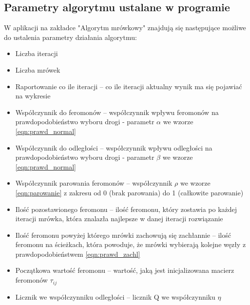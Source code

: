 \documentclass[12pt]{article}
\begin{document}
\subsection{Parametry algorytmu ustalane w programie}
W aplikacji na zakładce "Algorytm mrówkowy" znajdują się następujące możliwe do ustalenia parametry działania algorytmu:
\begin{itemize}
\item Liczba iteracji
\item Liczba mrówek
\item Raportowanie co ile iteracji -- co ile iteracji aktualny wynik ma się pojawiać na wykresie
\item Współczynnik do feromonów -- współczynnik wpływu feromonów na prawdopodobieństwo wyboru drogi - parametr $\alpha$ we wzorze \eqref{eqn:prawd_normal}
\item Współczynnik do odległości -- współczynnik wpływu odległości na prawdopodobieństwo wyboru drogi - parametr $\beta$ we wzorze \eqref{eqn:prawd_normal}
\item Współczynnik parowania feromonów -- współczynnik $\rho$ we wzorze \eqref{eqn:parowanie} z zakresu od 0 (brak parowania) do 1 (całkowite parowanie)
\item Ilość pozostawionego feromonu -- ilość feromonu, który zostawia po każdej iteracji mrówka, która znalazła najlepsze w danej iteracji rozwiązanie
\item Ilość feromonu powyżej którego mrówki zachowują się zachłannie -- ilość feromonu na ścieżkach, która powoduje, że mrówki wybierają kolejne węzły z prawdopodobieństwem \eqref{eqn:prawd_zachl}
\item Początkowa wartość feromonu -- wartość, jaką jest inicjalizowana macierz feromonów $\tau_{ij}$
\item Licznik we współczynniku odległości -- licznik Q we współczynniku $\eta$
\end{itemize}
\end{document}
